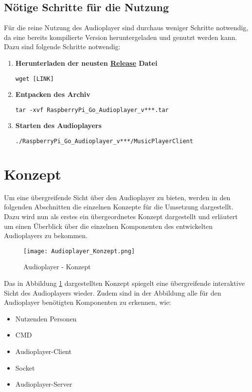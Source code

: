 \subsection{Nötige Schritte für die Nutzung}
Für die reine Nutzung des Audioplayer sind durchaus weniger Schritte notwendig,
da eine bereits kompilierte Version heruntergeladen und genutzt werden kann.
Dazu sind folgende Schritte notwendig:
\begin{enumerate}
\item \textbf{Herunterladen der neusten \href{https://github.com/alexanderklapdor/RaspberryPi_Go_Audioplayer/releases}{Release} Datei}  \\
\begin{lstlisting}
wget [LINK]
\end{lstlisting}

\item \textbf{Entpacken des Archiv} \\
\begin{lstlisting}
tar -xvf RaspberryPi_Go_Audioplayer_v***.tar
\end{lstlisting}

\item \textbf{Starten des Audioplayers} \\
\begin{lstlisting}
./RaspberryPi_Go_Audioplayer_v***/MusicPlayerClient
\end{lstlisting}
\end{enumerate}

\section{Konzept}
Um eine übergreifende Sicht über den Audioplayer zu bieten, werden in den
folgenden Abschnitten die einzelnen Konzepte für die Umsetzung dargestellt.
Dazu wird nun als erstes ein übergeordnetes Konzept dargestellt und erläutert
um einen Überblick über die einzelnen Komponenten des entwickelten Audioplayers
zu bekommen.

\begin{figure}[h]
	\centering
	\texttt{[image: Audioplayer\_Konzept.png]}
	\caption{Audioplayer - Konzept}
	\label{img:Konzept-Audioplayer}
\end{figure}

Das in Abbildung \ref{img:Konzept-Audioplayer} dargestellten Konzept spiegelt
eine übergreifende interaktive Sicht des Audioplayers wieder. Zudem sind in der
Abbildung alle für den Audioplayer benötigten Komponenten zu erkennen, wie:
\begin{itemize}
\item Nutzenden Personen
\item \ac{CMD}
\item Audioplayer-Client
\item Socket
\item Audioplayer-Server
\end{itemize}

